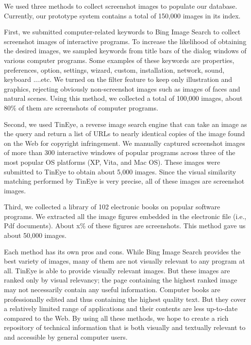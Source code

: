 \documentclass{www2010-submission}
\begin{document}
We used three methods to collect screenshot images to populate our
database. Currently, our prototype system contains a total of
150,000 images in its index.

First, we submitted computer-related keywords to Bing Image Search
to collect screenshot images of interactive programs. To increase
the likelihood of obtaining the desired images, we sampled
keywords from title bars of the dialog windows of various computer
programs. Some examples of these keywords are properties,
preferences, option, settings, wizard, custom, installation,
network, sound, keyboard ....etc. We turned on the filter feature
to keep only illustration and graphics, rejecting obviously
non-screenshot images such as images of faces and natural scenes.
Using this method, we collected a total of 100,000 images, about
80\% of them are screenshots of computer programs.

Second, we used TinEye, a reverse image search engine that can
take an image as the query and return a list of URLs to nearly
identical copies of the image found on the Web for copyright
infringement. We manually captured screenshot images of more than
300 interactive windows of popular programs across three of the
most popular OS platforms (XP, Vita, and Mac OS). These images
were submitted to TinEye to obtain about 5,000 images. Since the
visual similarity matching performed by TinEye is very precise,
all of these images are screenshot images.

Third, we collected a library of 102 electronic books on popular
software programs. We extracted all the image figures embedded in
the electronic file (i.e., Pdf documents). About x\% of these
figures are screenshots. This method gave us about 50,000 images.

Each method has its own pros and cons. While Bing Image Search
provides the best variety of images, many of them are not visually
relevant to any program at all. TinEye is able to provide visually
relevant images. But these images are ranked only by visual
relevancy; the page containing the highest ranked image may not
necessarily contain any useful information. Computer books are
professionally edited and thus containing the highest quality
text. But they cover a relatively limited range of applications
and their contents are less up-to-date compared to the Web. By
using all these methods, we hope to create a rich repository of
technical information that is both visually and textually relevant
to and accessible by general computer users.
\end{document}
